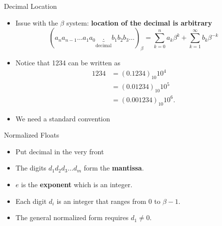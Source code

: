 \documentclass[10pt]{beamer}
\begin{document}
\begin{frame}{Decimal Location}

\begin{itemize}
    \item Issue with the $\beta$ system: \textbf{location of the decimal is arbitrary}
        \begin{equation*}
        (a_n a_{n-1} \ldots a_1 a_0 \underbrace{.}_{\text{decimal}} b_1 b_2 b_3 \ldots)_{\beta} = \sum_{k=0}^{n} a_k \beta^{k} + \sum_{k=1}^{\infty} b_k \beta^{-k}
        \end{equation*}
    \item Notice that 1234 can be written as 
\begin{align*}
1234&= (0.1234)_{10}10^4\\
&= (0.01234)_{10}10^5\\
&=(0.001234)_{10}10^6.
\end{align*}

    \item We need a standard convention 
\end{itemize}

\end{frame}
\begin{frame}{Normalized Floats}

\begin{itemize}
\item Put decimal in the very front
  \item The digits $d_1d_2d_3\dots d_m$ form the \textbf{mantissa}. 
  \item $e$ is the \textbf{exponent} which is an integer.
  \item Each digit $d_i$ is an integer that ranges from 0 to $\beta-1$.
  \item The general normalized form requires $d_1 \ne 0$.
\end{itemize}
\end{frame}
\end{document}
